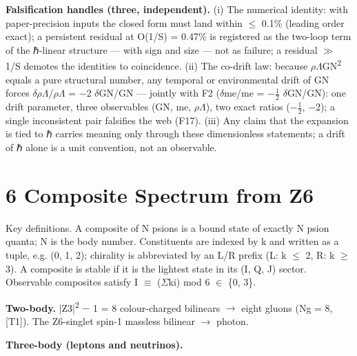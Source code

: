 \documentclass[11pt,letterpaper]{article}
\begin{document}
\noindent \textbf{Falsification handles (three, independent). }(i) The numerical identity: with paper-precision inputs the closed form must land within $\le$ 0.1\% (leading order exact); a persistent residual at O(1/S) = 0.47\% is registered as the two-loop term of the ℏ-linear structure --- with sign and size --- not as failure; a residual $\gg$ 1/S demotes the identities to coincidence. (ii) The co-drift law: because $\rho$$\Lambda$GN\textsuperscript{2} equals a pure structural number, any temporal or environmental drift of GN forces $\delta$$\rho$$\Lambda$/$\rho$$\Lambda$ = $-$2 $\delta$GN/GN --- jointly with F2 ($\delta$me/me = $-$$\tfrac{1}{2}$ $\delta$GN/GN): one drift parameter, three observables (GN, me, $\rho$$\Lambda$), two exact ratios ($-$$\tfrac{1}{2}$, $-$2); a single inconsistent pair falsifies the web (F17). (iii) Any claim that the expansion is tied to ℏ carries meaning only through these dimensionless statements; a drift of ℏ alone is a unit convention, not an observable.

\section*{6  Composite Spectrum from Z6}

\noindent Key definitions. A composite of N psions is a bound state of exactly N psion quanta; N is the body number. Constituents are indexed by k and written as a tuple, e.g. (0, 1, 2); chirality is abbreviated by an L/R prefix (L: k $\le$ 2, R: k $\ge$ 3). A composite is stable if it is the lightest state in its (I, Q, J) sector. Observable composites satisfy I $\equiv$ ($\Sigma$ki) mod 6 $\in$ \{0, 3\}.

\noindent \textbf{Two-body. }|Z3|\textsuperscript{2} $-$ 1 = 8 colour-charged bilinears $\to$ eight gluons (Ng = 8, [T1]). The Z6-singlet spin-1 massless bilinear $\to$ photon.

\noindent \textbf{Three-body (leptons and neutrinos).}
\end{document}
